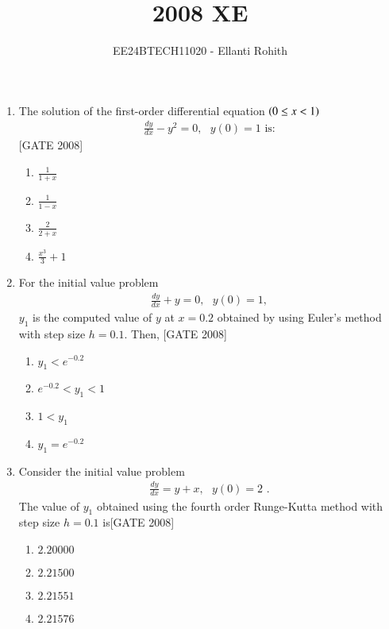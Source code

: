 \documentclass[journal,12pt,onecolumn]{IEEEtran}
\theoremstyle{remark}
\begin{document}

\vspace{3cm}

\title{2008 XE}
\author{EE24BTECH11020 -  Ellanti Rohith}
\maketitle

\renewcommand{\thefigure}{\theenumi}
\renewcommand{\thetable}{\theenumi}
\begin{enumerate}

\item The solution of the first-order differential equation $\left(0 \leq x < 1\right)$
\begin{align*}
    \frac{dy}{dx} - y^2 = 0,\text{ } y(0) = 1 \text{ is:}
\end{align*} 
\hfill{[GATE 2008]}
\begin{multicols}{4}
\begin{enumerate}
    \item $\frac{1}{1 + x} $ 
    \item $ \frac{1}{1 - x} $
    \item $ \frac{2}{2 + x} $
\    \item $ \frac{x^3}{3} + 1 $
\end{enumerate}
\end{multicols}

\item For the initial value problem 
\begin{align*}
    \frac{dy}{dx} + y = 0 ,  \text{ }y(0) = 1 , 
\end{align*} $ y_1 $  is the computed value of $ y $ at $ x = 0.2 $ obtained by using Euler's method with step size $ h = 0.1 $. Then,
\hfill{[GATE 2008]}
\begin{multicols}{2}
    \begin{enumerate}
    \item $ y_1 < e^{-0.2} $
    \item $ e^{-0.2} < y_1 < 1 $
    \item $ 1 < y_1 $
    \item $ y_1 = e^{-0.2} $
\end{enumerate}
\end{multicols}


\item  Consider the initial value problem \begin{align*}
    \frac{dy}{dx} = y + x , \text{ }  y(0) = 2\text{ .} 
\end{align*}
The value of $ y_1 $ obtained using the fourth order Runge-Kutta method with step size $ h = 0.1 $ is\hfill{[GATE 2008]}
\begin{multicols}{4}
    \begin{enumerate}
    \item $ 2.20000 $
    \item $ 2.21500 $
    \item $ 2.21551 $
    \item $ 2.21576 $
\end{enumerate}
\end{multicols}



\end{enumerate}
\end{document}
